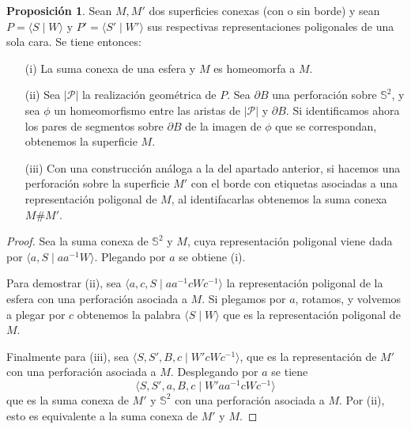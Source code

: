\documentclass[10pt]{report}
\newcommand{\Esfera}{\mathbb{S}^2}
\theoremstyle{definition}
\newtheorem{prop}[defin]{Proposición}
\begin{document}
\begin{prop}\label{prop:suma_esfera}
Sean $M,M'$ dos superficies conexas (con o sin borde) y sean $P=\langle S\mid W\rangle$ y $P'=\langle S'\mid W'\rangle$ sus respectivas representaciones poligonales de una sola cara. Se tiene entonces:
\begin{itemize}
\item[(i)] La suma conexa de una esfera y $M$ es homeomorfa a $M$.
\item[(ii)] Sea $|\mathcal{P}|$ la realización geométrica de $P$. Sea $\partial B$ una perforación sobre $\Esfera$, y sea $\phi$ un homeomorfismo entre las aristas de $|\mathcal{P}|$ y $\partial B$. Si identificamos ahora los pares de segmentos sobre $\partial B$ de la imagen de $\phi$ que se correspondan, obtenemos la superficie $M$. 
\item[(iii)] Con una construcción análoga a la del apartado anterior, si hacemos una perforación sobre la superficie $M'$ con el borde con etiquetas asociadas a una representación poligonal de $M$, al identifacarlas obtenemos la suma conexa $M\# M'$. 
\end{itemize}
\end{prop}
\begin{proof}
Sea la suma conexa de $\Esfera$ y $M$, cuya representación poligonal viene dada por $\langle a,S\mid aa^{-1}W\rangle$. Plegando por $a$ se obtiene (i).

Para demostrar (ii), sea $\langle a,c,S\mid aa^{-1}cWc^{-1}\rangle$ la representación poligonal de la esfera con una perforación asociada a $M$. Si plegamos por $a$, rotamos, y volvemos a plegar por $c$ obtenemos la palabra $\langle S\mid W\rangle$ que es la representación poligonal de $M$.

Finalmente para (iii), sea $\langle S,S',B,c\mid W'cWc^{-1}\rangle$, que es la representación de $M'$ con una perforación asociada a $M$. Desplegando por $a$ se tiene $$\langle S,S',a,B,c\mid W'aa^{-1}cWc^{-1}\rangle$$ que es la suma conexa de $M'$ y $\Esfera$ con una perforación asociada a $M$. Por (ii), esto es equivalente a la suma conexa de $M'$ y $M$. 
\end{proof}
\end{document}
